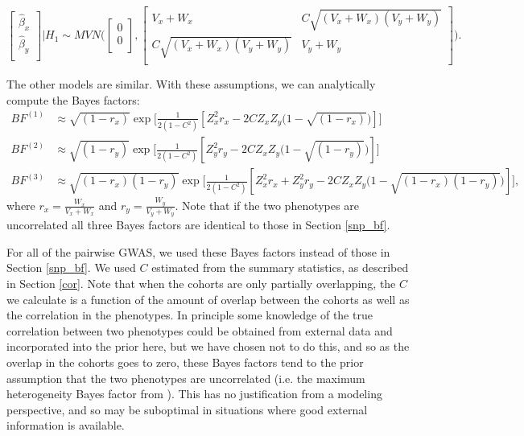 \documentclass[11pt,titlepage]{article}
\begin{document}
\begin{equation}
    \begin{bmatrix}
    \hat \beta_x        \\[0.3em]
      \hat \beta_y     \\[0.3em]
     \end{bmatrix} | H_1
     \sim 
     MVN \bigg( 
          \begin{bmatrix}
     0       \\[0.3em]
     0     \\[0.3em]
     \end{bmatrix}
     , 
        \begin{bmatrix}
     V_x+W_x  & C\sqrt{ (V_x+W_x)(V_y+W_y)}  \\[0.3em]
       C\sqrt{ (V_x+W_x)(V_y+W_y)}  & V_y+W_y    \\[0.3em]
     \end{bmatrix}
 \bigg).
\end{equation}

The other models are similar. With these assumptions, we can analytically compute the Bayes factors:
\begin{align}
BF^{(1)} &\approx \sqrt{(1-r_x)} \exp \bigg[\frac{1}{2(1-C^2)} [ Z_x^2 r_x - 2C Z_x Z_y \big(1-\sqrt{ (1-r_x)} \big)] \bigg] \\
BF^{(2)} &\approx \sqrt{(1-r_y)} \exp \bigg[\frac{1}{2(1-C^2)} [ Z_y^2 r_y - 2C Z_x Z_y \big(1-\sqrt{ (1-r_y)} \big)] \bigg] \\
BF^{(3)} &\approx \sqrt{(1-r_x)(1-r_y)} \exp \bigg[\frac{1}{2(1-C^2)} [ Z_x^2 r_x +Z_y^2 r_y- 2C Z_x Z_y \big(1-\sqrt{ (1-r_x)(1-r_y)} \big)] \bigg],
\end{align}
\noindent where $r_x = \frac{W_x}{V_x+W_x}$ and $r_y = \frac{W_y}{V_y+W_y}$. Note that if the two phenotypes are uncorrelated all three Bayes factors are identical to those in Section \ref{snp_bf}. 

For all of the pairwise GWAS, we used these Bayes factors instead of those in Section \ref{snp_bf}. We used $C$ estimated from the summary statistics, as described in Section \ref{cor}. Note that when the cohorts are only partially overlapping, the $C$ we calculate is a function of the amount of overlap between the cohorts as well as the correlation in the phenotypes. In principle some knowledge of the true correlation between two phenotypes could be obtained from external data and incorporated into the prior here, but we have chosen not to do this, and so as the overlap in the cohorts goes to zero, these Bayes factors tend to the prior assumption that the two phenotypes are uncorrelated (i.e. the maximum heterogeneity Bayes factor from  \citet{wen2014bayesian}). This has no justification from a modeling perspective, and so may be suboptimal in situations where good external information is available.
\end{document}
